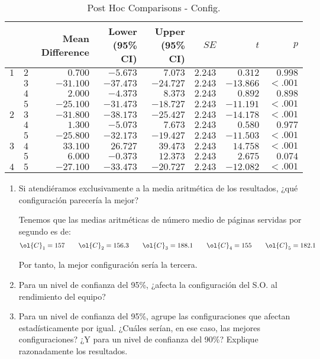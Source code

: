 \begin{ejercicio}
\begin{table}[h]
\centering
\begin{tabular}{@{}llrrrrrr@{}}
\toprule
 & & Mean Difference & Lower (95\% CI) & Upper (95\% CI) & $SE$ & $t$ & $p$ \\
\midrule
$1$ & $2$ & $0.700$ & $-5.673$ & $7.073$ & $2.243$ & $0.312$ & $0.998$ \\
    & $3$ & $-31.100$ & $-37.473$ & $-24.727$ & $2.243$ & $-13.866$ & $< .001$ \\
    & $4$ & $2.000$ & $-4.373$ & $8.373$ & $2.243$ & $0.892$ & $0.898$ \\
    & $5$ & $-25.100$ & $-31.473$ & $-18.727$ & $2.243$ & $-11.191$ & $< .001$ \\
$2$ & $3$ & $-31.800$ & $-38.173$ & $-25.427$ & $2.243$ & $-14.178$ & $< .001$ \\
    & $4$ & $1.300$ & $-5.073$ & $7.673$ & $2.243$ & $0.580$ & $0.977$ \\
    & $5$ & $-25.800$ & $-32.173$ & $-19.427$ & $2.243$ & $-11.503$ & $< .001$ \\
$3$ & $4$ & $33.100$ & $26.727$ & $39.473$ & $2.243$ & $14.758$ & $< .001$ \\
    & $5$ & $6.000$ & $-0.373$ & $12.373$ & $2.243$ & $2.675$ & $0.074$ \\
$4$ & $5$ & $-27.100$ & $-33.473$ & $-20.727$ & $2.243$ & $-12.082$ & $< .001$ \\
\bottomrule
\end{tabular}
\caption{Post Hoc Comparisons - Config.}
\label{tab:ej:4.17_anova_2}
\end{table}

\begin{enumerate}
    \item Si atendiéramos exclusivamente a la media aritmética de los resultados, ¿qué configuración parecería la mejor?
    
    Tenemos que las medias aritméticas de número medio de páginas servidas por segundo es de:
    \begin{align*}
        \ol{C}_1 = 157\qquad
        \ol{C}_2 = 156.3\qquad 
        \ol{C}_3 = 188.1\qquad 
        \ol{C}_4 = 155\qquad 
        \ol{C}_5 = 182.1
    \end{align*}

    Por tanto, la mejor configuración sería la tercera.
    \item Para un nivel de confianza del 95\%, ¿afecta la configuración del S.O. al rendimiento del equipo?
    \item Para un nivel de confianza del 95\%, agrupe las configuraciones que afectan estadísticamente por igual. ¿Cuáles serían, en ese caso, las mejores configuraciones? ¿Y para un nivel de confianza del 90\%? Explique razonadamente los resultados.
\end{enumerate}
\end{ejercicio}
